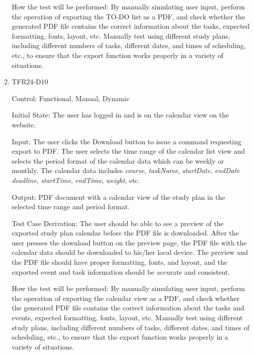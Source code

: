 \documentclass[12pt, titlepage]{article}
\begin{document}
\begin{enumerate}
How the test will be performed: By manually simulating user input, perform the operation of exporting the TO-DO list as a PDF, and check whether the generated PDF file contains the correct information about the tasks, expected formatting, fonts, layout, etc. Manually test using different study plans, including different numbers of tasks, different dates, and times of scheduling, etc., to ensure that the export function works properly in a variety of situations.

\item{TFR24-D10\\} \label{TFR24-D10}

Control: Functional, Manual, Dynamic
					
Initial State: The user has logged in and is on the calendar view on the website.
					
Input: The user clicks the Download button to issue a command requesting export to PDF. The user selects the time range of the calendar list view and selects the period format of the calendar data which can be weekly or monthly. The calendar data includes \textit{course}, \textit{taskName}, \textit{startDate}, \textit{endDate} \textit{deadline}, \textit{startTime}, \textit{endTime}, \textit{weight}, etc.
					
Output: PDF document with a calendar view of the study plan in the selected time range and period format.

Test Case Derivation: The user should be able to see a preview of the exported study plan calendar before the PDF file is downloaded. After the user presses the download button on the preview page, the PDF file with the calendar data should be downloaded to his/her local device. The preview and the PDF file should have proper formatting, fonts, and layout, and the exported event and task information should be accurate and consistent.
					
How the test will be performed: By manually simulating user input, perform the operation of exporting the calendar view as a PDF, and check whether the generated PDF file contains the correct information about the tasks and events, expected formatting, fonts, layout, etc. Manually test using different study plans, including different numbers of tasks, different dates, and times of scheduling, etc., to ensure that the export function works properly in a variety of situations.

\end{enumerate}
\end{document}
